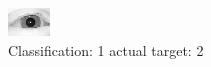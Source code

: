 \begin{figure}[h!]
\begin{center}
\includegraphics[width=0.60\columnwidth]{figures/ID3083_class_1_target_2.png}
\end{center}
\caption{ Classification: 1 actual target: 2}
\label{fig:ID3083_class_1_target_2}
\end{figure}
